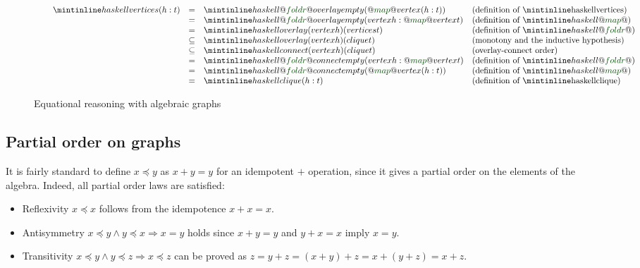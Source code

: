 \begin{figure}
\[
\begin{array}{rcll}
\hspace{6mm}\hs{vertices (h:t)} & = & \hs{@\std{foldr}@ overlay empty (@\std{map}@ vertex (h:t))} & \text{(definition of \hs{vertices})}\\
 & = & \hs{@\std{foldr}@ overlay empty (vertex h : @\std{map}@ vertex t)} & \text{(definition of }\hs{@\std{map}@}\text{)}\\
 & = & \hs{overlay (vertex h) (vertices t)} & \text{(definition of }\hs{@\std{foldr}@}\text{)}\\
 & \subseteq & \hs{overlay (vertex h) (clique t)} & \text{(monotony and the inductive hypothesis)}\\
 & \subseteq & \hs{connect (vertex h) (clique t)} & \text{(overlay-connect order)}\\
 & = & \hs{@\std{foldr}@ connect empty (vertex h : @\std{map}@ vertex t)} & \text{(definition of }\hs{@\std{foldr}@}\text{)}\\
 & = & \hs{@\std{foldr}@ connect empty (@\std{map}@ vertex (h:t))} & \text{(definition of }\hs{@\std{map}@}\text{)}\\
 & = & \hs{clique (h:t)} & \text{(definition of \hs{clique})}\\
\end{array}
\]
\caption{Equational reasoning with algebraic graphs\label{fig-proof}}
\end{figure}

\subsection{Partial order on graphs}\label{sub-partial-order}

It is fairly standard to define $x \preceq y$ as $x + y = y$ for an
idempotent $+$ operation, since it gives a partial order on the elements
of the algebra. Indeed, all partial order laws are satisfied:

\begin{itemize}
     \item Reflexivity $x \preceq x$ follows from the idempotence $x + x = x$.
     \item Antisymmetry $x \preceq y \wedge y \preceq x \Rightarrow x = y$ holds
     since $x + y = y$ and $y + x = x$ imply $x = y$.
     \item Transitivity $x \preceq y \wedge y \preceq z \Rightarrow x \preceq z$
     can be proved as $z = y + z = (x + y) + z = x + (y + z) = x + z$.
 \end{itemize}


